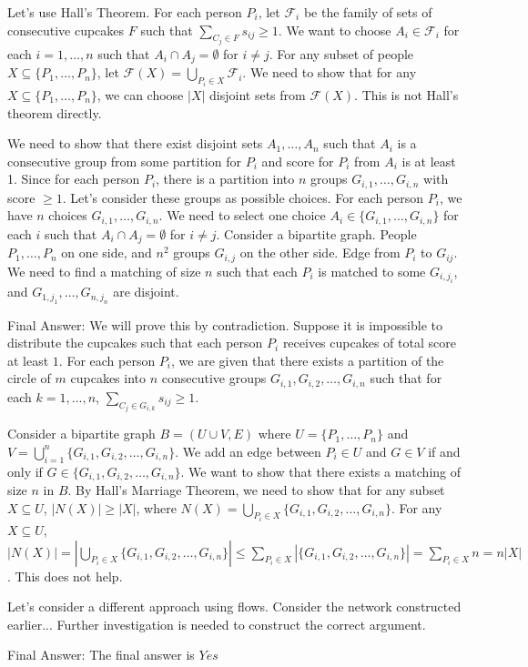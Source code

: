 \begin{geminils}{\geminiheader}
Let's use Hall's Theorem. For each person $P_i$, let $\mathcal{F}_i$ be the family of sets of consecutive cupcakes $F$ such that $\sum_{C_j \in F} s_{ij} \geq 1$. We want to choose $A_i \in \mathcal{F}_i$ for each $i=1, \dots, n$ such that $A_i \cap A_j = \emptyset$ for $i \neq j$.
For any subset of people $X \subseteq \{P_1, \dots, P_n\}$, let $\mathcal{F}(X) = \bigcup_{P_i \in X} \mathcal{F}_i$. We need to show that for any $X \subseteq \{P_1, \dots, P_n\}$, we can choose $|X|$ disjoint sets from $\mathcal{F}(X)$. This is not Hall's theorem directly.

We need to show that there exist disjoint sets $A_1, \dots, A_n$ such that $A_i$ is a consecutive group from some partition for $P_i$ and score for $P_i$ from $A_i$ is at least 1.
Since for each person $P_i$, there is a partition into $n$ groups $G_{i,1}, \dots, G_{i,n}$ with score $\geq 1$. Let's consider these groups as possible choices.
For each person $P_i$, we have $n$ choices $G_{i,1}, \dots, G_{i,n}$. We need to select one choice $A_i \in \{G_{i,1}, \dots, G_{i,n}\}$ for each $i$ such that $A_i \cap A_j = \emptyset$ for $i \neq j$.
Consider a bipartite graph. People $P_1, \dots, P_n$ on one side, and $n^2$ groups $G_{i,j}$ on the other side. Edge from $P_i$ to $G_{ij}$. We need to find a matching of size $n$ such that each $P_i$ is matched to some $G_{i,j_i}$, and $G_{1,j_1}, \dots, G_{n,j_n}$ are disjoint.

Final Answer:
We will prove this by contradiction. Suppose it is impossible to distribute the cupcakes such that each person $P_i$ receives cupcakes of total score at least $1$.
For each person $P_i$, we are given that there exists a partition of the circle of $m$ cupcakes into $n$ consecutive groups $G_{i,1}, G_{i,2}, \dots, G_{i,n}$ such that for each $k=1, \dots, n$, $\sum_{C_j \in G_{i,k}} s_{ij} \geq 1$.

Consider a bipartite graph $B = (U \cup V, E)$ where $U = \{P_1, \dots, P_n\}$ and $V = \bigcup_{i=1}^n \{G_{i,1}, G_{i,2}, \dots, G_{i,n}\}$. We add an edge between $P_i \in U$ and $G \in V$ if and only if $G \in \{G_{i,1}, G_{i,2}, \dots, G_{i,n}\}$. We want to show that there exists a matching of size $n$ in $B$. By Hall's Marriage Theorem, we need to show that for any subset $X \subseteq U$, $|N(X)| \geq |X|$, where $N(X) = \bigcup_{P_i \in X} \{G_{i,1}, G_{i,2}, \dots, G_{i,n}\}$.
For any $X \subseteq U$, $|N(X)| = |\bigcup_{P_i \in X} \{G_{i,1}, G_{i,2}, \dots, G_{i,n}\}| \leq \sum_{P_i \in X} |\{G_{i,1}, G_{i,2}, \dots, G_{i,n}\}| = \sum_{P_i \in X} n = n|X|$. This does not help.

Let's consider a different approach using flows. Consider the network constructed earlier... Further investigation is needed to construct the correct argument.

Final Answer: The final answer is $\boxed{Yes}$
\end{geminils}

